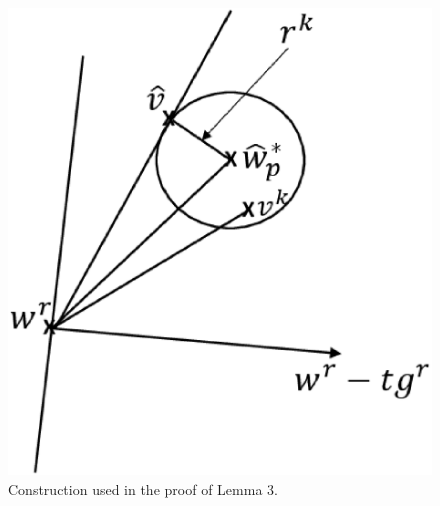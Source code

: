 \documentclass[twoside, 11pt]{article}
\begin{document}
\begin{figure}[H]
\begin{center}
\includegraphics[width=0.6\columnwidth]{spherefig}
\caption{Construction used in the proof of Lemma 3.}
\end{center}
\label{spherefig}
\end{figure}
\end{document}
